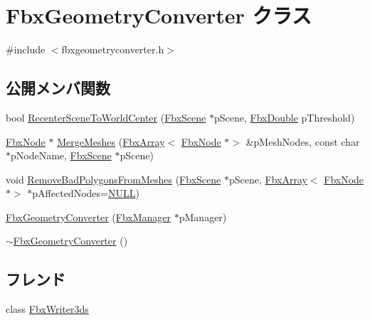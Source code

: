 \hypertarget{class_fbx_geometry_converter}{}\section{Fbx\+Geometry\+Converter クラス}
\label{class_fbx_geometry_converter}


{\ttfamily \#include $<$fbxgeometryconverter.\+h$>$}

\subsection*{公開メンバ関数}
\begin{DoxyCompactItemize}
\item 
bool \hyperlink{class_fbx_geometry_converter_a26aa6da6240c0293e449958f8a58a779}{Recenter\+Scene\+To\+World\+Center} (\hyperlink{class_fbx_scene}{Fbx\+Scene} $\ast$p\+Scene, \hyperlink{fbxtypes_8h_a171e72a1c46fc15c1a6c9c31948c1c5b}{Fbx\+Double} p\+Threshold)
\item 
\hyperlink{class_fbx_node}{Fbx\+Node} $\ast$ \hyperlink{class_fbx_geometry_converter_a0870c4520e42e88aaed5c5a8cca0c7ec}{Merge\+Meshes} (\hyperlink{class_fbx_array}{Fbx\+Array}$<$ \hyperlink{class_fbx_node}{Fbx\+Node} $\ast$$>$ \&p\+Mesh\+Nodes, const char $\ast$p\+Node\+Name, \hyperlink{class_fbx_scene}{Fbx\+Scene} $\ast$p\+Scene)
\item 
void \hyperlink{class_fbx_geometry_converter_ae9f8c321399875d9d5df3ae49ebf428d}{Remove\+Bad\+Polygons\+From\+Meshes} (\hyperlink{class_fbx_scene}{Fbx\+Scene} $\ast$p\+Scene, \hyperlink{class_fbx_array}{Fbx\+Array}$<$ \hyperlink{class_fbx_node}{Fbx\+Node} $\ast$$>$ $\ast$p\+Affected\+Nodes=\hyperlink{fbxarch_8h_a070d2ce7b6bb7e5c05602aa8c308d0c4}{N\+U\+LL})
\item 
\hyperlink{class_fbx_geometry_converter_a6eada73a1b581c807d55b44941d3d7be}{Fbx\+Geometry\+Converter} (\hyperlink{class_fbx_manager}{Fbx\+Manager} $\ast$p\+Manager)
\item 
\hyperlink{class_fbx_geometry_converter_ab3950419ba338daaa002afc4e73d70fa}{$\sim$\+Fbx\+Geometry\+Converter} ()
\end{DoxyCompactItemize}
\subsection*{フレンド}
\begin{DoxyCompactItemize}
\item 
class \hyperlink{class_fbx_geometry_converter_af608b805e0fdfadf8f73af0f1e948bf5}{Fbx\+Writer3ds}
\end{DoxyCompactItemize}
